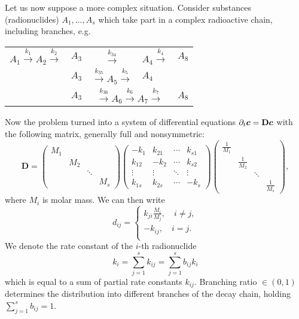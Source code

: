 Let us now suppose a more complex situation. Consider substances (radionuclides) $A_1,\ldots, A_s$ which take 
part in a complex radioactive chain, including branches, e.g.
\begin{center}
\begin{tabular}{rccll}
 $A_1\xrightarrow{k_1}A_2\xrightarrow{k_2}$ & $A_3$ & $ \xrightarrow{k_{34}}$ & $A_4\xrightarrow{k_4}$ & $A_8$ \\
 & $A_3$ & $\xrightarrow{k_{35}} A_5 \xrightarrow{k_{5}}$ & $A_4$ &\\
 & $A_3$ & \multicolumn{2}{c}{$\xrightarrow{k_{36}} A_6 \xrightarrow{k_{6}} A_7 \xrightarrow{k_{7}}$} & $A_8$
\end{tabular}
\end{center}
Now the problem turned into a system of differential equations $\partial_t \mathbf{\boldsymbol{c}}=\mathbf{D}\mathbf{\boldsymbol{c}}$ with the following
matrix, generally full and nonsymmetric:
\[
\mathbf{D} = \begin{pmatrix} M_1 &     && \\ 
                                 & M_2 && \\
                                 && \ddots & \\
                  && & M_s \end{pmatrix}
             \begin{pmatrix} -k_1 &k_{21}& \cdots & k_{s1} \\ 
                  k_{12} & -k_2 & \cdots & k_{s2} \\
                  \vdots &\vdots& \ddots & \vdots \\
                  k_{1s} &k_{2s}& \cdots & -k_s \end{pmatrix}
             \begin{pmatrix} \frac{1}{M_1} &     && \\ 
                                 & \frac{1}{M_2} && \\
                                 && \ddots & \\
                  && & \frac{1}{M_s} \end{pmatrix},
\]
where $M_i$ is molar mass. We can then write
\begin{equation} \label{eqn:reaction_system_entries}
d_{ij} =
  \begin{cases}
  k_{ji} \frac{M_i}{M_j}, \quad i\neq j, \\
  -k_{ij}, \quad i=j. \\
  \end{cases}
\end{equation}
We denote the rate constant of the $i$-th radionuclide
\[
  k_i=\sum_{j=1}^{s}k_{ij}=\sum_{j=1}^{s}b_{ij}k_i
\]
which is equal to a sum of partial rate constants $k_{ij}$. Branching ratio $\in(0,1)$ 
determines the distribution into different branches of the decay chain, holding $\sum_{j=1}^{s}b_{ij}=1$.

